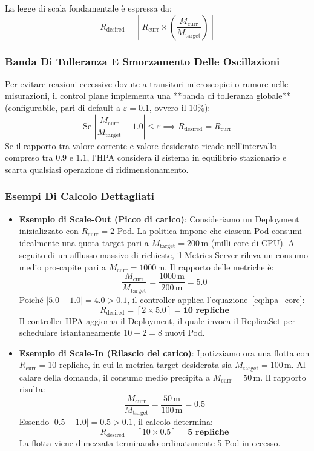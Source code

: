 \documentclass[11pt, a4paper]{article}
\begin{document}
La legge di scala fondamentale è espressa da:
\begin{equation}
    \boxed{R_{\text{desired}} = \left\lceil R_{\text{curr}} \times \left( \frac{M_{\text{curr}}}{M_{\text{target}}} \right) \right\rceil}
    \label{eq:hpa_core}
\end{equation}

\subsubsection{Banda Di Tolleranza E Smorzamento Delle Oscillazioni}
Per evitare reazioni eccessive dovute a transitori microscopici o rumore nelle misurazioni, il control plane implementa una **banda di tolleranza globale** (configurabile, pari di default a $\varepsilon = 0.1$, ovvero il $10\%$):
\begin{equation}
    \text{Se } \left| \frac{M_{\text{curr}}}{M_{\text{target}}} - 1.0 \right| \le \varepsilon \implies R_{\text{desired}} = R_{\text{curr}}
\end{equation}
Se il rapporto tra valore corrente e valore desiderato ricade nell'intervallo compreso tra $0.9$ e $1.1$, l'HPA considera il sistema in equilibrio stazionario e scarta qualsiasi operazione di ridimensionamento.

\subsubsection{Esempi Di Calcolo Dettagliati}
\begin{itemize}
    \item \textbf{Esempio di Scale-Out (Picco di carico)}:
    Consideriamo un Deployment inizializzato con $R_{\text{curr}} = 2$ Pod. La politica impone che ciascun Pod consumi idealmente una quota target pari a $M_{\text{target}} = 200\,\text{m}$ (milli-core di CPU). A seguito di un afflusso massivo di richieste, il Metrics Server rileva un consumo medio pro-capite pari a $M_{\text{curr}} = 1000\,\text{m}$.
    Il rapporto delle metriche è:
    \[
        \frac{M_{\text{curr}}}{M_{\text{target}}} = \frac{1000\,\text{m}}{200\,\text{m}} = 5.0
    \]
    Poiché $|5.0 - 1.0| = 4.0 > 0.1$, il controller applica l'equazione~\eqref{eq:hpa_core}:
    \[
        R_{\text{desired}} = \left\lceil 2 \times 5.0 \right\rceil = \mathbf{10 \text{ repliche}}
    \]
    Il controller HPA aggiorna il Deployment, il quale invoca il ReplicaSet per schedulare istantaneamente $10 - 2 = 8$ nuovi Pod.

    \item \textbf{Esempio di Scale-In (Rilascio del carico)}:
    Ipotizziamo ora una flotta con $R_{\text{curr}} = 10$ repliche, in cui la metrica target desiderata sia $M_{\text{target}} = 100\,\text{m}$. Al calare della domanda, il consumo medio precipita a $M_{\text{curr}} = 50\,\text{m}$.
    Il rapporto risulta:
    \[
        \frac{M_{\text{curr}}}{M_{\text{target}}} = \frac{50\,\text{m}}{100\,\text{m}} = 0.5
    \]
    Essendo $|0.5 - 1.0| = 0.5 > 0.1$, il calcolo determina:
    \[
        R_{\text{desired}} = \left\lceil 10 \times 0.5 \right\rceil = \mathbf{5 \text{ repliche}}
    \]
    La flotta viene dimezzata terminando ordinatamente 5 Pod in eccesso.
\end{itemize}
\end{document}
